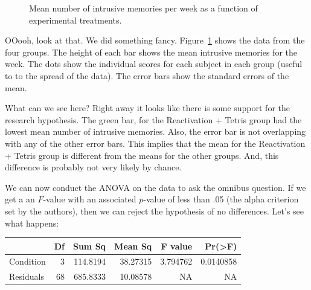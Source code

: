 \documentclass[
  letterpaper,
  DIV=11,
  numbers=noendperiod]{scrreprt}
\begin{document}
\begin{figure}


\caption{\label{fig-8tetrisData}Mean number of intrusive memories per
week as a function of experimental treatments.}

\end{figure}%

OOooh, look at that. We did something fancy.
Figure~\ref{fig-8tetrisData} shows the data from the four groups. The
height of each bar shows the mean intrusive memories for the week. The
dots show the individual scores for each subject in each group (useful
to to the spread of the data). The error bars show the standard errors
of the mean.

What can we see here? Right away it looks like there is some support for
the research hypothesis. The green bar, for the Reactivation + Tetris
group had the lowest mean number of intrusive memories. Also, the error
bar is not overlapping with any of the other error bars. This implies
that the mean for the Reactivation + Tetris group is different from the
means for the other groups. And, this difference is probably not very
likely by chance.

We can now conduct the ANOVA on the data to ask the omnibus question. If
we get a an \(F\)-value with an associated \(p\)-value of less than .05
(the alpha criterion set by the authors), then we can reject the
hypothesis of no differences. Let's see what happens:

\begin{longtable}[]{@{}lrrrrr@{}}
\toprule\noalign{}
& Df & Sum Sq & Mean Sq & F value & Pr(\textgreater F) \\
\midrule\noalign{}
\endhead
\bottomrule\noalign{}
\endlastfoot
Condition & 3 & 114.8194 & 38.27315 & 3.794762 & 0.0140858 \\
Residuals & 68 & 685.8333 & 10.08578 & NA & NA \\
\end{longtable}
\end{document}
